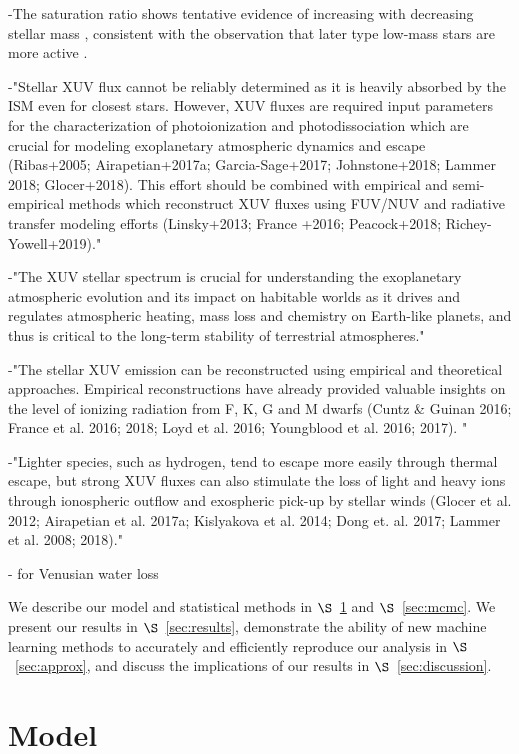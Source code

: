 \documentclass[twocolumn]{aastex62}
\begin{document}
-The saturation ratio shows tentative evidence of increasing with decreasing stellar mass \citep{Wright2011,Jackson2012}, consistent with the observation that later type low-mass stars are more active \citep[e.g.][]{West2008}. 

-"Stellar XUV flux cannot be reliably determined as it is heavily absorbed by the ISM
even for closest stars. However, XUV fluxes are required input parameters for the characterization
of photoionization and photodissociation which are crucial for modeling exoplanetary atmospheric
dynamics and escape (Ribas+2005; Airapetian+2017a; Garcia-Sage+2017; Johnstone+2018; 
Lammer 2018; Glocer+2018). This effort should be combined with empirical and semi-empirical
methods which reconstruct XUV fluxes using FUV/NUV and radiative transfer modeling efforts
(Linsky+2013; France +2016; Peacock+2018; Richey-Yowell+2019)."

-"The XUV stellar spectrum is crucial for understanding the
exoplanetary atmospheric evolution and its impact on habitable worlds as it drives and regulates
atmospheric heating, mass loss and chemistry on Earth-like planets, and thus is critical to the
long-term stability of terrestrial atmospheres."

-"The stellar XUV emission can be reconstructed using empirical and theoretical
approaches. Empirical reconstructions have already provided valuable insights on the level of
ionizing radiation from F, K, G and M dwarfs (Cuntz \& Guinan 2016; France et al. 2016; 2018;
Loyd et al. 2016; Youngblood et al. 2016; 2017). "

-"Lighter species, such as hydrogen, tend to escape more easily through thermal escape, but
strong XUV fluxes can also stimulate the loss of light and heavy ions through ionospheric
outflow and exospheric pick-up by stellar winds (Glocer et al. 2012; Airapetian et al. 2017a;
Kislyakova et al. 2014; Dong et. al. 2017; Lammer et al. 2008; 2018)."

-\citet{Chassefiere1997} for Venusian water loss

We describe our model and statistical methods in $\S$~\ref{sec:model} and $\S$~\ref{sec:mcmc}. We present our results in $\S$~\ref{sec:results}, demonstrate the ability of new machine learning methods to accurately and efficiently reproduce our analysis in $\S$~\ref{sec:approx}, and discuss the implications of our results in $\S$~\ref{sec:discussion}.

\section{Model} \label{sec:model}
\end{document}

